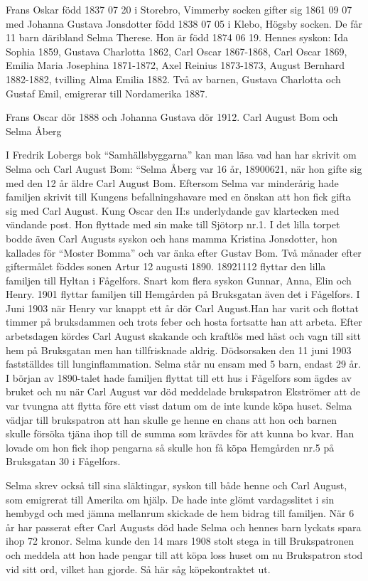 Frans Oskar född 1837 07 20 i Storebro, Vimmerby socken gifter sig 1861 09 07 med Johanna Gustava Jonsdotter född 1838 07 05 i Klebo, Högsby socken.
De får 11 barn däribland Selma Therese. Hon är född 1874 06 19. 
Hennes syskon: Ida Sophia 1859, Gustava Charlotta 1862, Carl Oscar 1867-1868, Carl Oscar 1869, Emilia Maria Josephina 1871-1872, Axel Reinius 1873-1873, August Bernhard 1882-1882, tvilling Alma Emilia 1882.
Två av barnen, Gustava Charlotta och Gustaf Emil, emigrerar till Nordamerika 1887.


Frans Oscar dör 1888 och Johanna Gustava dör
 1912.
Carl August Bom och Selma Åberg




I Fredrik Lobergs bok “Samhällsbyggarna” kan man läsa vad han har skrivit om Selma och Carl August Bom:
“Selma Åberg var 16 år, 18900621, när hon gifte sig med den 12 år äldre Carl August Bom. Eftersom Selma var minderårig hade familjen skrivit till Kungens befallningshavare med en önskan att hon fick gifta sig med Carl August. Kung Oscar den II:s underlydande gav klartecken med vändande post. 
Hon flyttade med sin make till Sjötorp nr.1. I det lilla torpet bodde även Carl Augusts syskon och hans mamma Kristina Jonsdotter, hon kallades för “Moster Bomma” och var änka efter Gustav Bom.
Två månader efter giftermålet föddes sonen Artur 12 augusti 1890.
18921112 flyttar den lilla familjen till Hyltan i Fågelfors.  Snart kom flera syskon Gunnar, Anna, Elin och Henry. 1901 flyttar familjen till Hemgården på Bruksgatan även det i Fågelfors.  I Juni 1903 när Henry var knappt ett år dör Carl August.Han har varit och flottat timmer på bruksdammen och trots feber och hosta fortsatte han att arbeta. Efter arbetsdagen kördes Carl August skakande och kraftlös med häst och vagn till sitt hem på Bruksgatan men han tillfrisknade aldrig. Dödsorsaken den 11 juni 1903 fastställdes till lunginflammation. Selma står nu ensam med 5 barn, endast 29 år. I början av 1890-talet hade familjen flyttat till ett hus i Fågelfors som ägdes av bruket och nu när Carl August var död meddelade brukspatron Ekströmer att de var tvungna att flytta före ett visst datum om de inte kunde köpa huset. Selma vädjar till brukspatron att han skulle ge henne en chans att hon och barnen skulle försöka tjäna ihop till de summa som krävdes för att kunna bo kvar. Han lovade om hon fick ihop pengarna så skulle hon få köpa Hemgården nr.5 på Bruksgatan 30 i Fågelfors.




Selma skrev också till sina släktingar, syskon till både henne och Carl August, som emigrerat till Amerika om hjälp. De hade inte glömt vardagsslitet i sin hembygd och med jämna mellanrum skickade de hem bidrag till familjen.
När 6 år har passerat efter Carl Augusts död hade Selma och hennes barn lyckats spara ihop 72 kronor.
 Selma kunde den 14 mars 1908 stolt stega in till Brukspatronen och meddela att hon hade pengar till att köpa loss huset om nu Brukspatron stod vid sitt ord, vilket han gjorde.
Så här såg köpekontraktet ut.


